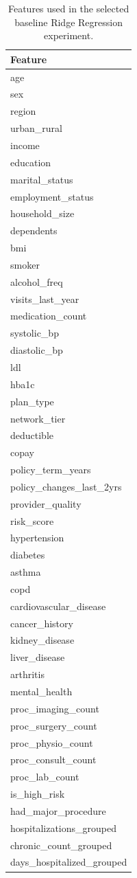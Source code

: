 \begin{table}
\caption{Features used in the selected baseline Ridge Regression experiment.}
\label{tab:04-ridge-selected-experiment-features}
\begin{tabular}{l}
\toprule
Feature \\
\midrule
age \\
sex \\
region \\
urban_rural \\
income \\
education \\
marital_status \\
employment_status \\
household_size \\
dependents \\
bmi \\
smoker \\
alcohol_freq \\
visits_last_year \\
medication_count \\
systolic_bp \\
diastolic_bp \\
ldl \\
hba1c \\
plan_type \\
network_tier \\
deductible \\
copay \\
policy_term_years \\
policy_changes_last_2yrs \\
provider_quality \\
risk_score \\
hypertension \\
diabetes \\
asthma \\
copd \\
cardiovascular_disease \\
cancer_history \\
kidney_disease \\
liver_disease \\
arthritis \\
mental_health \\
proc_imaging_count \\
proc_surgery_count \\
proc_physio_count \\
proc_consult_count \\
proc_lab_count \\
is_high_risk \\
had_major_procedure \\
hospitalizations_grouped \\
chronic_count_grouped \\
days_hospitalized_grouped \\
\bottomrule
\end{tabular}
\end{table}
